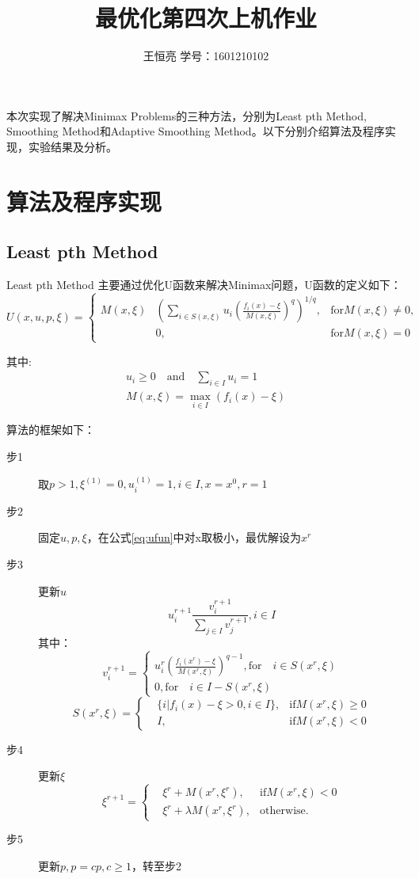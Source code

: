 \documentclass{ctexart}
\begin{document}
\title{最优化第四次上机作业}
\author{王恒亮 \quad 学号：1601210102}
\date{}
\maketitle
本次实现了解决Minimax Problems的三种方法，分别为Least pth Method\cite{Charalambous1979}, Smoothing Method\cite{Xu2001}和Adaptive Smoothing Method\cite{Polak2003}。以下分别介绍算法及程序实现，实验结果及分析。
\section{算法及程序实现}
\subsection{Least pth Method}
Least pth Method 主要通过优化U函数来解决Minimax问题，U函数的定义如下：
\begin{equation}
	\label{eq:ufun}
	U(x,u,p,\xi)=\left\{
		\begin{aligned}
			M(x,\xi)&(\sum_{i\in S(x,\xi)}{u_i(\frac{f_i(x)-\xi}{M(x,\xi)})^q})^{1/q}, &\text{for} M(x,\xi) \neq 0,\\
				       &0, &\text{for} M(x,\xi) = 0
		\end{aligned}\right.
\end{equation}

其中:
\begin{align}
	u_i \geq 0\quad \text{and} \quad\sum_{i\in I}{u_i} = 1\\
	M(x, \xi) = \max_{i\in I}{(f_i(x) - \xi)}
\end{align}

算法的框架如下：
\begin{description}
	\item[步1] 取$p>1, \xi^{(1)} =0,u_i^{(1)}=1,i\in I,x=x^0,r=1$
	\item[步2] 固定$u,p,\xi$，在公式\ref{eq:ufun}中对x取极小，最优解设为$x^r$
	\item[步3] 更新$u$
	\[u^{r+1}_i\frac{v_i^{r+1}}{\sum_{j\in I}{v_j^{r+1}}}, i\in I\]
	其中：
	\[v_{i}^{r+1}=\left\{
		\begin{aligned}
			u_i^r(\frac{f_i(x^r)-\xi}{M(x^r,\xi)})^{q-1}, \text{for}\quad i \in S(x^r,\xi)\\
			0, \text{for}\quad i\in I - S(x^r, \xi)
		\end{aligned}\right.\]
	\[S(x^r, \xi)=\left\{
		\begin{aligned}
			&\{i|f_i(x)-\xi>0,i\in I\}, &\text{if} M(x^r,\xi) \geq 0\\
			&I, &\text{if} M(x^r,\xi) <0
		\end{aligned}\right.\]
	\item[步4] 更新$\xi$
	\[\xi^{r+1} = \left\{
		\begin{aligned}
			&\xi^r + M(x^r, \xi^r) , &\text{if} M(x^r, \xi) < 0\\
			&\xi^r + \lambda M(x^r, \xi^r), &\text{otherwise.}
		\end{aligned}\right.\]
	\item[步5] 更新$p, p = cp, c\geq 1$，转至步2
\end{description}
\end{document}
